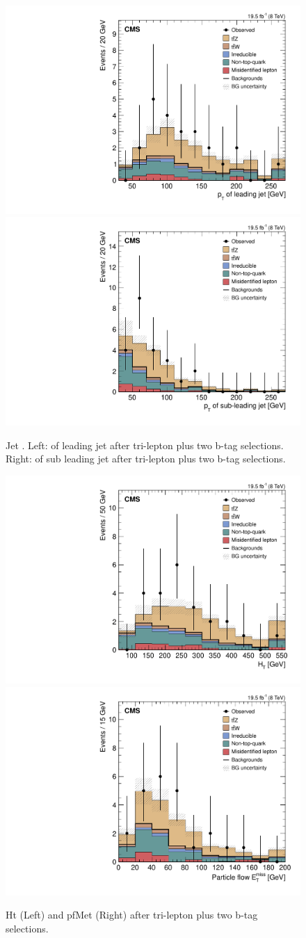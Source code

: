 \begin{figure}[h]
\begin{center}
\includegraphics[width=0.48\linewidth]{Figs/Plots_PreSelections/hJ1Pt_3L2b.pdf}
\includegraphics[width=0.48\linewidth]{Figs/Plots_PreSelections/hJ2Pt_3L2b.pdf}
\caption{\label{fig:JPt_3L2b}
Jet \pt . Left: \pt of leading jet after tri-lepton plus two b-tag selections. Right: \pt of sub leading jet after tri-lepton plus two b-tag selections.
}
\end{center}
\end{figure}

\begin{figure}[h]
\begin{center}
\includegraphics[width=0.48\linewidth]{Figs/Plots_PreSelections/hHt_3L2b.pdf}
\includegraphics[width=0.48\linewidth]{Figs/Plots_PreSelections/hPFMet_3L2b.pdf}
\caption{\label{fig:hht_pfmet_3l}
Ht (Left) and pfMet (Right) after tri-lepton plus two b-tag selections.
}
\end{center}
\end{figure}







